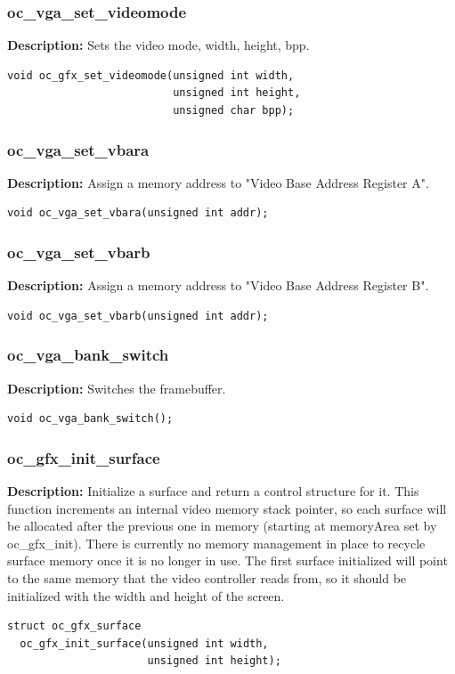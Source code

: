 \documentclass[10pt,a4paper]{article}
\begin{document}
\subsubsection{oc\_vga\_set\_videomode}
\textbf{Description:} Sets the video mode, width, height, bpp.
\begin{lstlisting}
void oc_gfx_set_videomode(unsigned int width, 
                          unsigned int height, 
                          unsigned char bpp);
\end{lstlisting}

\subsubsection{oc\_vga\_set\_vbara}
\textbf{Description:} Assign a memory address to "Video Base Address Register A".
\begin{lstlisting}
void oc_vga_set_vbara(unsigned int addr);
\end{lstlisting}

\subsubsection{oc\_vga\_set\_vbarb}
\textbf{Description:} Assign a memory address to "Video Base Address Register B".
\begin{lstlisting}
void oc_vga_set_vbarb(unsigned int addr);
\end{lstlisting}

\subsubsection{oc\_vga\_bank\_switch}
\textbf{Description:} Switches the framebuffer.
\begin{lstlisting}
void oc_vga_bank_switch();
\end{lstlisting}

\subsubsection{oc\_gfx\_init\_surface}
\textbf{Description:} Initialize a surface and return a control structure for it. This function increments an internal video memory stack pointer, so each surface will be allocated after the previous one in memory (starting at memoryArea set by oc\_gfx\_init). There is currently no memory management in place to recycle surface memory once it is no longer in use. The first surface initialized will point to the same memory that the video controller reads from, so it should be initialized with the width and height of the screen.
\begin{lstlisting}
struct oc_gfx_surface
  oc_gfx_init_surface(unsigned int width,
                      unsigned int height);
\end{lstlisting}
\end{document}
